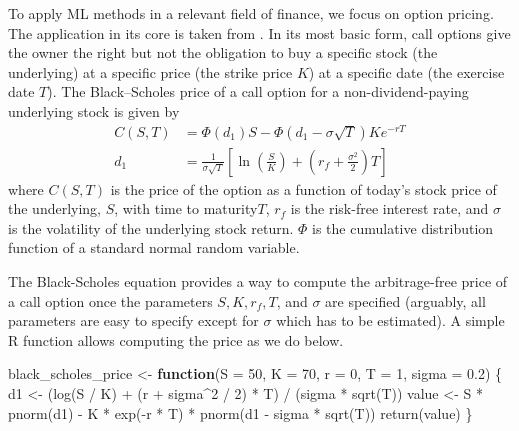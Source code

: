 \documentclass[
]{krantz}
\newenvironment{Shaded}{\begin{snugshade}}{\end{snugshade}}
\newcommand{\AttributeTok}[1]{\textcolor[rgb]{0.61,0.61,0.61}{#1}}
\newcommand{\ControlFlowTok}[1]{\textcolor[rgb]{0.27,0.27,0.27}{\textbf{#1}}}
\newcommand{\DecValTok}[1]{\textcolor[rgb]{0.06,0.06,0.06}{#1}}
\newcommand{\FloatTok}[1]{\textcolor[rgb]{0.06,0.06,0.06}{#1}}
\newcommand{\FunctionTok}[1]{\textcolor[rgb]{0,0,0}{#1}}
\newcommand{\NormalTok}[1]{#1}
\newcommand{\OtherTok}[1]{\textcolor[rgb]{0.37,0.37,0.37}{#1}}
\newcommand{\SpecialCharTok}[1]{\textcolor[rgb]{0,0,0}{#1}}
\begin{document}
To apply ML methods in a relevant field of finance, we focus on option pricing. The application in its core is taken from \citet{Hull2020}. In its most basic form, call options give the owner the right but not the obligation to buy a specific stock (the underlying) at a specific price (the strike price \(K\)) at a specific date (the exercise date \(T\)). The Black--Scholes price \citep{Black1976} of a call option for a non-dividend-paying underlying stock is given by
\[
\begin{aligned}
  C(S, T) &= \Phi(d_1)S - \Phi(d_1 - \sigma\sqrt{T})Ke^{-r T} \\
     d_1 &= \frac{1}{\sigma\sqrt{T}}\left[\ln\left(\frac{S}{K}\right) + \left(r_f + \frac{\sigma^2}{2}\right)T\right]
\end{aligned}
\]
where \(C(S, T)\) is the price of the option as a function of today's stock price of the underlying, \(S\), with time to maturity\(T\), \(r_f\) is the risk-free interest rate, and \(\sigma\) is the volatility of the underlying stock return. \(\Phi\) is the cumulative distribution function of a standard normal random variable.

The Black-Scholes equation provides a way to compute the arbitrage-free price of a call option once the parameters \(S, K, r_f, T\), and \(\sigma\) are specified (arguably, all parameters are easy to specify except for \(\sigma\) which has to be estimated). A simple R function allows computing the price as we do below.

\begin{Shaded}
\begin{Highlighting}[]
\NormalTok{black\_scholes\_price }\OtherTok{\textless{}{-}} \ControlFlowTok{function}\NormalTok{(}\AttributeTok{S =} \DecValTok{50}\NormalTok{, }\AttributeTok{K =} \DecValTok{70}\NormalTok{, }\AttributeTok{r =} \DecValTok{0}\NormalTok{, }\AttributeTok{T =} \DecValTok{1}\NormalTok{, }\AttributeTok{sigma =} \FloatTok{0.2}\NormalTok{) \{}
\NormalTok{  d1 }\OtherTok{\textless{}{-}}\NormalTok{ (}\FunctionTok{log}\NormalTok{(S }\SpecialCharTok{/}\NormalTok{ K) }\SpecialCharTok{+}\NormalTok{ (r }\SpecialCharTok{+}\NormalTok{ sigma}\SpecialCharTok{\^{}}\DecValTok{2} \SpecialCharTok{/} \DecValTok{2}\NormalTok{) }\SpecialCharTok{*}\NormalTok{ T) }\SpecialCharTok{/}\NormalTok{ (sigma }\SpecialCharTok{*} \FunctionTok{sqrt}\NormalTok{(T))}
\NormalTok{  value }\OtherTok{\textless{}{-}}\NormalTok{ S }\SpecialCharTok{*} \FunctionTok{pnorm}\NormalTok{(d1) }\SpecialCharTok{{-}}\NormalTok{ K }\SpecialCharTok{*} \FunctionTok{exp}\NormalTok{(}\SpecialCharTok{{-}}\NormalTok{r }\SpecialCharTok{*}\NormalTok{ T) }\SpecialCharTok{*} \FunctionTok{pnorm}\NormalTok{(d1 }\SpecialCharTok{{-}}\NormalTok{ sigma }\SpecialCharTok{*} \FunctionTok{sqrt}\NormalTok{(T))}
  \FunctionTok{return}\NormalTok{(value)}
\NormalTok{\}}
\end{Highlighting}
\end{Shaded}
\end{document}
